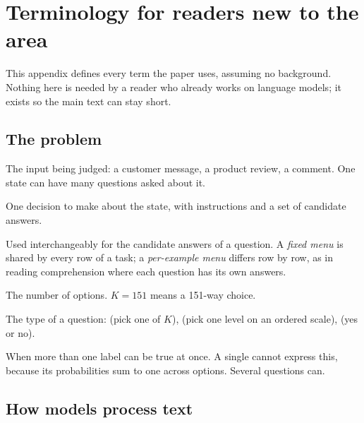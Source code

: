 \section{Terminology for readers new to the area}
\label{app:glossary}

This appendix defines every term the paper uses, assuming no background.
Nothing here is needed by a reader who already works on language models;
it exists so the main text can stay short.

\subsection{The problem}

\begin{description}[leftmargin=0em,style=nextline,itemsep=0.3em]

\item[State] The input being judged: a customer message, a product review,
a comment. One state can have many questions asked about it.

\item[Question] One decision to make about the state, with instructions
and a set of candidate answers.

\item[Option, menu, criteria] Used interchangeably for the candidate
answers of a question. A \emph{fixed menu} is shared by every row of a
task; a \emph{per-example menu} differs row by row, as in reading
comprehension where each question has its own answers.

\item[$K$] The number of options. $K{=}151$ means a 151-way choice.

\item[Primitive] The type of a question: \choice{} (pick one of $K$),
\score{} (pick one level on an ordered scale), \noul{} (yes or no).

\item[Multi-label] When more than one label can be true at once. A single
\choice{} cannot express this, because its probabilities sum to one across
options. Several \noul{} questions can.

\end{description}

\subsection{How models process text}

